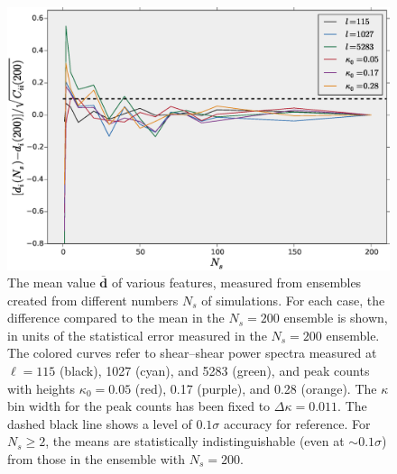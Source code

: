 \documentclass[reprint,aps,prd,superscriptaddress,showkeys,showpacs]{revtex4-1}
\newcommand{\bb}[1]{\mathbf{#1}}
\begin{document}
\begin{figure}
\includegraphics[scale=0.3]{Figures/means_ns.eps}
\caption{The mean value $\bb{\bar{d}}$ of various features, measured
  from ensembles created from different numbers $N_s$ of simulations.
  For each case, the difference compared to the mean in the $N_s=200$
  ensemble is shown, in units of the statistical error measured in the
  $N_s=200$ ensemble.  The colored curves refer to shear--shear power
  spectra measured at $\ell=115$ (black), 1027 (cyan), and 5283
  (green), and peak counts with heights $\kappa_0=0.05$ (red), 0.17
  (purple), and 0.28 (orange). The $\kappa$ bin width for the peak
  counts has been fixed to $\Delta\kappa=0.011$. The dashed black line
  shows a level of $0.1\sigma$ accuracy for reference.  For $N_s\geq
  2$, the means are statistically indistinguishable (even at
  $\sim0.1\sigma$) from those in the ensemble with $N_s=200$.}
\label{means_ns}
\end{figure}
\end{document}
